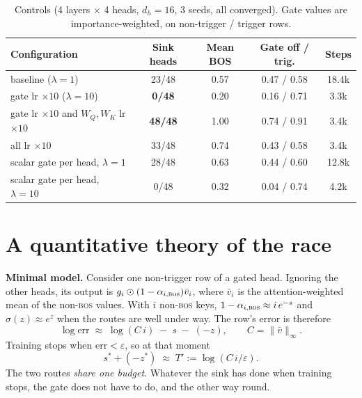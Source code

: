 \documentclass{article} %
\newcommand{\bos}{\textsc{bos}}
\begin{document}
\begin{table}[t]
\caption{Controls (4 layers $\times$ 4 heads, $d_h=16$, 3 seeds, all converged). Gate values are
importance-weighted, on non-trigger / trigger rows.}
\label{tab:controls}
\centering
\small
\begin{tabular}{lcccc}
\toprule
Configuration & Sink heads & Mean BOS & Gate off / trig. & Steps \\
\midrule
baseline ($\lambda=1$) & 23/48 & 0.57 & 0.47 / 0.58 & 18.4k \\
gate lr $\times10$ ($\lambda=10$) & \textbf{0/48} & 0.20 & 0.16 / 0.71 & 3.3k \\
gate lr $\times10$ and $W_Q,W_K$ lr $\times10$ & \textbf{48/48} & 1.00 & 0.74 / 0.91 & 3.4k \\
all lr $\times10$ & 33/48 & 0.74 & 0.43 / 0.58 & 3.4k \\
scalar gate per head, $\lambda=1$ & 28/48 & 0.63 & 0.44 / 0.60 & 12.8k \\
scalar gate per head, $\lambda=10$ & 0/48 & 0.32 & 0.04 / 0.74 & 4.2k \\
\bottomrule
\end{tabular}
\end{table}

\section{A quantitative theory of the race}
\label{sec:theory}
\textbf{Minimal model.} Consider one non-trigger row of a gated head. Ignoring the other heads, its output is
$g_i\odot(1-\alpha_{i,\bos})\bar v_i$, where $\bar v_i$ is the attention-weighted mean of the non-\bos{} values.
With $i$ non-\bos{} keys, $1-\alpha_{i,\bos}\approx i\,e^{-s}$ and $\sigma(z)\approx e^{z}$ when the routes
are well under way. The row's error is therefore
\begin{equation}
\log \text{err} \;\approx\; \log(C\,i) \;-\; s \;-\; (-z), \qquad C=\|\bar v\|_\infty .
\label{eq:budget}
\end{equation}
Training stops when $\text{err}<\varepsilon$, so at that moment
\begin{equation}
s^* + (-z^*) \;\approx\; T' := \log(C\,i/\varepsilon).
\label{eq:share}
\end{equation}
The two routes \emph{share one budget}. Whatever the sink has done when training stops, the gate does not
have to do, and the other way round.
\end{document}
